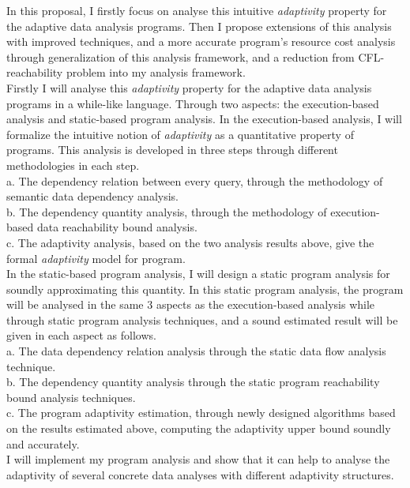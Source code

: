    In this proposal, I firstly focus on analyse this intuitive \emph{adaptivity} property for the adaptive data analysis programs. 
   Then I propose extensions of this analysis with improved techniques, 
   and a more accurate program's resource cost analysis through
   generalization of this analysis framework, and a reduction from CFL-reachability problem into my analysis framework.
   \\
   Firstly I will analyse this \emph{adaptivity} property for the adaptive data analysis programs in a while-like language.
   Through two aspects: the execution-based analysis and static-based program analysis.
	In the execution-based analysis, I will formalize the intuitive notion of \emph{adaptivity} as a quantitative 
   property of programs. This analysis is developed in three steps through different methodologies in each step. 
   \\
	a. The dependency relation between every query, through the methodology of semantic data dependency analysis.
   \\
	b. The dependency quantity analysis, through the methodology of execution-based data reachability bound analysis.
   \\
	c. The adaptivity analysis, based on the two analysis results above, give the formal \emph{adaptivity} model 
   for program.
   \\   
	In the static-based program analysis, I will design a static program analysis for soundly approximating this quantity.
   In this static program analysis, the program will be analysed in the same 3 aspects as the execution-based analysis 
   while through static program analysis techniques, and a sound estimated result will be given in each aspect as follows.
   \\
	a. The data dependency relation analysis through the static data flow analysis technique.
   \\
	b. The dependency quantity analysis through the static program reachability bound analysis techniques.
   \\
	c. The program adaptivity estimation, through newly designed algorithms based on the results estimated above, 
   computing the adaptivity upper bound soundly 
   and accurately.
   \\
   I will implement my program analysis and show that it can help to analyse the adaptivity of several concrete data analyses with different adaptivity structures.

